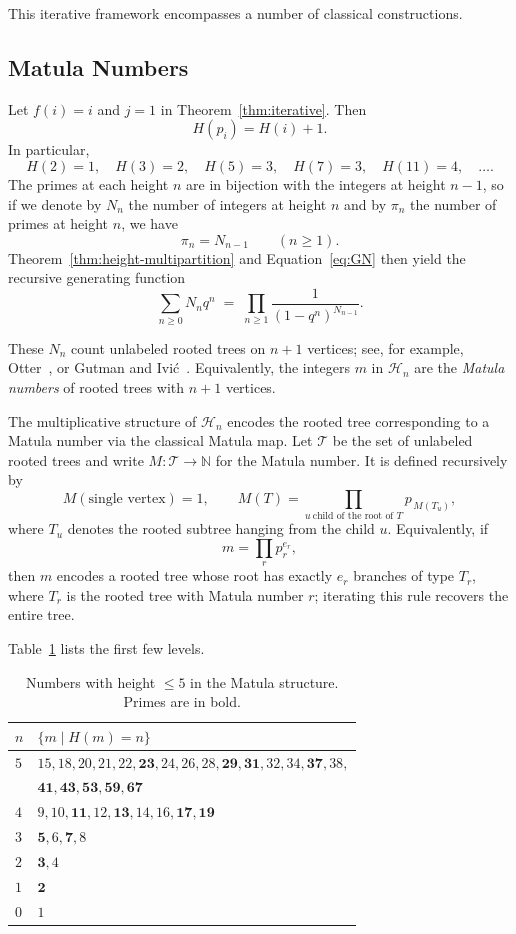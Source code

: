\documentclass[11pt]{article}
\theoremstyle{definition}
\begin{document}
This iterative framework encompasses a number of classical constructions.

\subsection{Matula Numbers}\label{ex:Matula}

Let $f(i)=i$ and $j=1$ in Theorem~\ref{thm:iterative}.  Then
\[
  H(p_i) = H(i) + 1.
\]
In particular,
\[
  H(2)=1,\quad H(3)=2,\quad H(5)=3,\quad H(7)=3,\quad H(11)=4,\quad\dots.
\]
The primes at each height $n$ are in bijection with the integers at
height $n-1$, so if we denote by $N_n$ the number of integers at
height $n$ and by $\pi_n$ the number of primes at height $n$, we have
\[
  \pi_n = N_{n-1}\qquad (n\ge1).
\]
Theorem~\ref{thm:height-multipartition} and Equation~\eqref{eq:GN} then yield
the recursive generating function
\begin{equation*}
  \sum_{n\ge0} N_n q^n
  \;=\;
  \prod_{n\ge1} \frac{1}{(1-q^n)^{N_{n-1}}}.
\end{equation*}

These $N_n$ count unlabeled rooted trees on $n+1$ vertices;
see, for example, Otter~\cite{otter}, or Gutman and Ivi\'c~\cite{gutman}.
Equivalently, the integers $m$ in $\mathcal{H}_n$ are the \emph{Matula numbers}
of rooted trees with $n+1$ vertices.

The multiplicative structure of $\mathcal{H}_n$ encodes the rooted tree
corresponding to a Matula number via the classical Matula map.
Let $\mathcal{T}$ be the set of unlabeled rooted trees and write $M:\mathcal{T}\to\mathbb N$
for the Matula number.  It is defined recursively by
\[
  M(\text{single vertex})=1,
  \qquad
  M(T)=\prod_{u\ \text{child of the root of }T} p_{\,M(T_u)},
\]
where $T_u$ denotes the rooted subtree hanging from the child $u$.
Equivalently, if
\[
  m=\prod_{r} p_r^{e_r},
\]
then $m$ encodes a rooted tree whose root has exactly $e_r$ branches of
type $T_r$, where $T_r$ is the rooted tree with Matula number $r$; iterating
this rule recovers the entire tree.

Table~\ref{tab:Matula} lists the first few levels.

\begin{table}[ht]
\centering
\begin{tabular}{| l | l | }
\hline\hline
$n$ & $\{m\mid H(m)=n\}$\\
\hline
$5$ & $15, 18, 20, 21, 22, \mathbf{23}, 24, 26, 28, \mathbf{29}, \mathbf{31}, 32, 34, \mathbf{37}, 38,$\\
    & $\mathbf{41}, \mathbf{43}, \mathbf{53}, \mathbf{59}, \mathbf{67}$ \\
$4$ & $9, 10, \mathbf{11}, 12, \mathbf{13}, 14, 16, \mathbf{17}, \mathbf{19}$ \\
$3$ & $\mathbf{5}, 6, \mathbf{7}, 8$ \\
$2$ & $\mathbf{3}, 4$ \\
$1$ & $\mathbf{2}$ \\
$0$ & $1$ \\
\hline
\end{tabular}
\caption{Numbers with height $\le 5$ in the Matula structure. Primes are in bold.}
\label{tab:Matula}
\end{table} 
\end{document}

